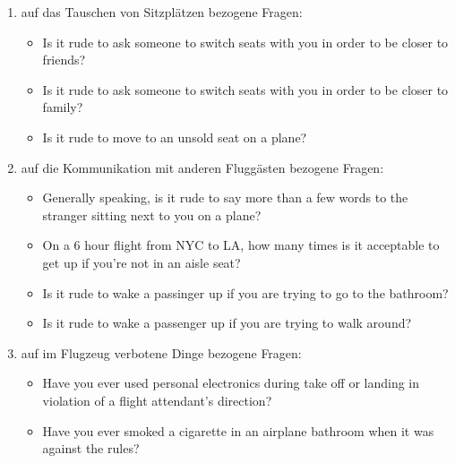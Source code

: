 \documentclass{mi-seminar}
\begin{document}
\begin{enumerate}
\item auf das Tauschen von Sitzplätzen bezogene Fragen: 
\begin{itemize}
\item Is it rude to ask someone to switch seats with you in order to be closer to friends?
\item Is it rude to ask someone to switch seats with you in order to be closer to family?
\item Is it rude to move to an unsold seat on a plane? 
\newline \newline
\end{itemize}


\item auf die Kommunikation mit anderen Fluggästen bezogene Fragen:
\begin{itemize}
\item Generally speaking, is it rude to say more than a few words to the stranger sitting next to you on a plane?
\item On a 6 hour flight from NYC to LA, how many times is it acceptable to get up if you're not in an aisle seat?
\item Is it rude to wake a passinger up if you are trying to go to the bathroom?
\item Is it rude to wake a passenger up if you are trying to walk around?
\newline \newline
\end{itemize}


\item auf im Flugzeug verbotene Dinge bezogene Fragen:
\begin{itemize}
\item Have you ever used personal electronics during take off or landing in violation of a flight attendant's direction?
\item Have you ever smoked a cigarette in an airplane bathroom when it was against the rules? 
\end{itemize}


\end{enumerate}
\end{document}
